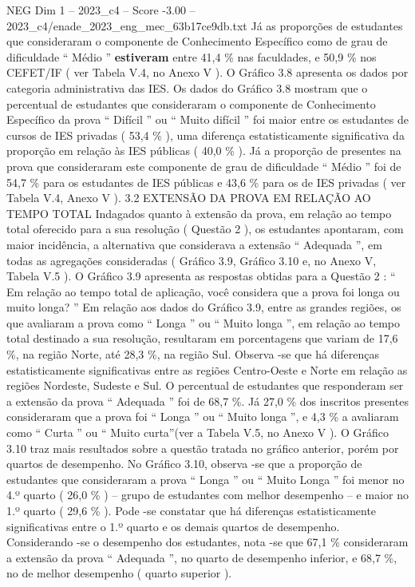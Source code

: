 \begin{textsample}{NEG Dim 1 – 2023\_c4 – Score -3.00 – 2023\_c4/enade\_2023\_eng\_mec\_63b17ce9db.txt}
Já as proporções de estudantes que consideraram o componente de Conhecimento Específico como de grau de dificuldade “ Médio ” \textbf{estiveram} entre 41,4 \% nas faculdades, e 50,9 \% nos CEFET/IF ( ver Tabela V.4, no Anexo V ).
O Gráfico 3.8 apresenta os dados por categoria administrativa das IES.
Os dados do Gráfico 3.8 mostram que o percentual de estudantes que consideraram o componente de Conhecimento Específico da prova “ Difícil ” ou “ Muito difícil ” foi maior entre os estudantes de cursos de IES privadas ( 53,4 \% ), uma diferença estatisticamente significativa da proporção em relação às IES públicas ( 40,0 \% ).
Já a proporção de presentes na prova que consideraram este componente de grau de dificuldade “ Médio ” foi de 54,7 \% para os estudantes de IES públicas e 43,6 \% para os de IES privadas ( ver Tabela V.4, Anexo V ). 3.2 EXTENSÃO DA PROVA EM RELAÇÃO AO TEMPO TOTAL Indagados quanto à extensão da prova, em relação ao tempo total oferecido para a sua resolução ( Questão 2 ), os estudantes apontaram, com maior incidência, a alternativa que considerava a extensão “ Adequada ”, em todas as agregações consideradas ( Gráfico 3.9, Gráfico 3.10 e, no Anexo V, Tabela V.5 ).
O Gráfico 3.9 apresenta as respostas obtidas para a Questão 2 : “ Em relação ao tempo total de aplicação, você considera que a prova foi longa ou muito longa? ” Em relação aos dados do Gráfico 3.9, entre as grandes regiões, os que avaliaram a prova como “ Longa ” ou “ Muito longa ”, em relação ao tempo total destinado a sua resolução, resultaram em porcentagens que variam de 17,6 \%, na região Norte, até 28,3 \%, na região Sul.
Observa -se que há diferenças estatisticamente significativas entre as regiões Centro-Oeste e Norte em relação as regiões Nordeste, Sudeste e Sul.
O percentual de estudantes que responderam ser a extensão da prova “ Adequada ” foi de 68,7 \%.
Já 27,0 \% dos inscritos presentes consideraram que a prova foi “ Longa ” ou “ Muito longa ”, e 4,3 \% a avaliaram como “ Curta ” ou “ Muito curta”(ver a Tabela V.5, no Anexo V ).
O Gráfico 3.10 traz mais resultados sobre a questão tratada no gráfico anterior, porém por quartos de desempenho.
No Gráfico 3.10, observa -se que a proporção de estudantes que consideraram a prova “ Longa ” ou “ Muito Longa ” foi menor no 4.º quarto ( 26,0 \% ) – grupo de estudantes com melhor desempenho – e maior no 1.º quarto ( 29,6 \% ).
Pode -se constatar que há diferenças estatisticamente significativas entre o 1.º quarto e os demais quartos de desempenho.
Considerando -se o desempenho dos estudantes, nota -se que 67,1 \% consideraram a extensão da prova “ Adequada ”, no quarto de desempenho inferior, e 68,7 \%, no de melhor desempenho ( quarto superior ).

\end{textsample}

